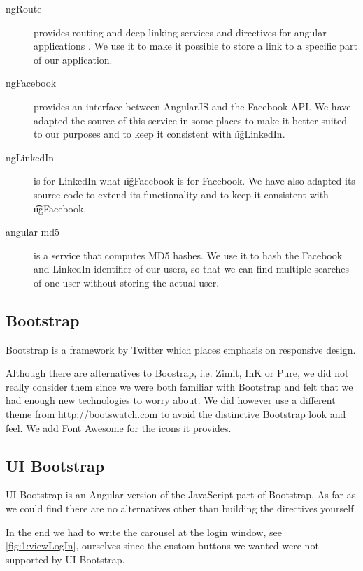 		\begin{description}
			\item[ngRoute] provides routing and deep-linking services and directives for angular applications \cite{angulardocsngRoute}. We use it to make it possible to store a link to a specific part of our application. 
			\item[ngFacebook] provides an interface between AngularJS and the Facebook API. We have adapted the source of this service in some places to make it better suited to our purposes and to keep it consistent with \t{ngLinkedIn}.
			\item[ngLinkedIn] is for LinkedIn what \t{ngFacebook} is for Facebook. We have also adapted its source code to extend its functionality and to keep it consistent with \t{ngFacebook}.
			\item[angular-md5] is a service that computes MD5 hashes. We use it to hash the Facebook and LinkedIn identifier of our users, so that we can find multiple searches of one user without storing the actual user. 
		\end{description}

\subsection{Bootstrap}
\label{ssec:1:bootstrap}
	Bootstrap is a framework by Twitter which places emphasis on responsive design. 

	Although there are alternatives to Boostrap, i.e. Zimit, InK or Pure, we did not really consider them since we were both familiar with Bootstrap and felt that we had enough new technologies to worry about. We did however use a different theme from \url{http://bootswatch.com} to avoid the distinctive Bootstrap look and feel. We add Font Awesome for the icons it provides. 

\subsection{UI Bootstrap}
\label{ssec:1:bootstrapUI}
	UI Bootstrap is an Angular version of the JavaScript part of Bootstrap. As far as we could find there are no alternatives other than building the directives yourself. 

	In the end we had to write the carousel at the login window, see \vref{fig:1:viewLogIn}, ourselves since the custom buttons we wanted were not supported by UI Bootstrap.

